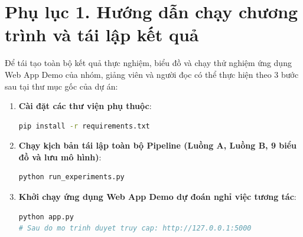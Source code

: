 \appendix
{}

\section*{Phụ lục 1. Hướng dẫn chạy chương trình và tái lập kết quả}
Để tái tạo toàn bộ kết quả thực nghiệm, biểu đồ và chạy thử nghiệm ứng dụng Web App Demo của nhóm, giảng viên và người đọc có thể thực hiện theo $3$ bước sau tại thư mục gốc của dự án:
\begin{enumerate}
    \item \textbf{Cài đặt các thư viện phụ thuộc}:
    \begin{lstlisting}[language=bash]
pip install -r requirements.txt
    \end{lstlisting}
    \item \textbf{Chạy kịch bản tái lập toàn bộ Pipeline (Luồng A, Luồng B, 9 biểu đồ và lưu mô hình)}:
    \begin{lstlisting}[language=bash]
python run_experiments.py
    \end{lstlisting}
    \item \textbf{Khởi chạy ứng dụng Web App Demo dự đoán nghỉ việc tương tác}:
    \begin{lstlisting}[language=bash]
python app.py
# Sau do mo trinh duyet truy cap: http://127.0.0.1:5000
    \end{lstlisting}
\end{enumerate}
